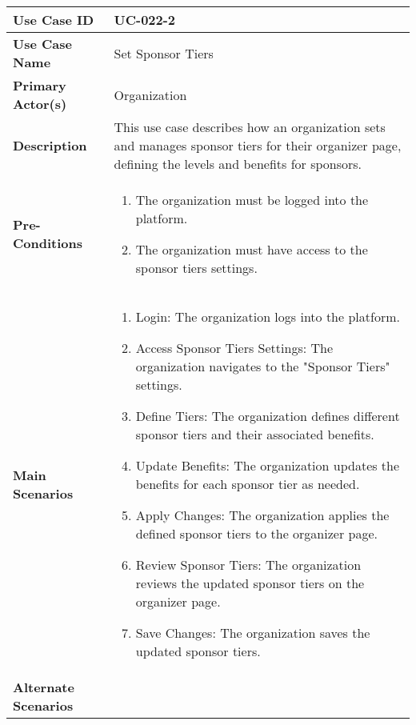 \begin{table}[!ht]
    \centering
    \renewcommand{\arraystretch}{1.3} %
    \begin{tabularx}{\textwidth}{|l|X|}
        \hline
        \textbf{Use Case ID} & UC-022-2 \\
        \hline
        \textbf{Use Case Name} & Set Sponsor Tiers \\
        \hline
        \textbf{Primary Actor(s)} & Organization \\
        \hline
        \textbf{Description} & This use case describes how an organization sets and manages sponsor tiers for their organizer page, defining the levels and benefits for sponsors. \\
        \hline
        \textbf{Pre-Conditions} & 
        \begin{enumerate}[label=\arabic*.,itemsep=0pt]
            \item The organization must be logged into the platform.
            \item The organization must have access to the sponsor tiers settings.
        \end{enumerate} \\
        \hline
        \textbf{Main Scenarios} & 
        \begin{enumerate}[label=\arabic*.,itemsep=0pt]
            \item Login: The organization logs into the platform.
            \item Access Sponsor Tiers Settings: The organization navigates to the "Sponsor Tiers" settings.
            \item Define Tiers: The organization defines different sponsor tiers and their associated benefits.
            \item Update Benefits: The organization updates the benefits for each sponsor tier as needed.
            \item Apply Changes: The organization applies the defined sponsor tiers to the organizer page.
            \item Review Sponsor Tiers: The organization reviews the updated sponsor tiers on the organizer page.
            \item Save Changes: The organization saves the updated sponsor tiers.
        \end{enumerate} \\
        \hline
        \textbf{Alternate Scenarios} & 
        \begin{itemize}[label=--,itemsep=0pt]

\end{itemize}
\end{tabularx}
\end{table}
